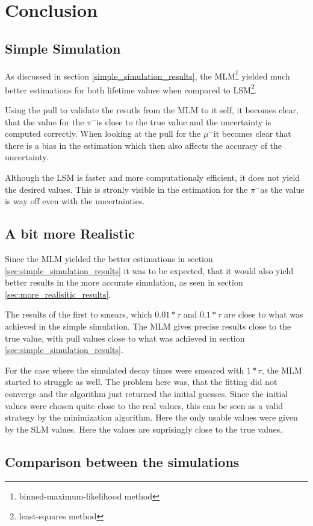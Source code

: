 \documentclass[11pt, a4paper, oneside]{book}
\newcommand{\pion}{$\pi^{-}$}
\newcommand{\muon}{$\mu^{-}$}
\begin{document}
\chapter{Conclusion}
\section{Simple Simulation}
As discussed in section \ref{simple_simulation_results}, the MLM\footnote{binned-maximum-likelihood method} yielded much better estimations for both lifetime values when compared to LSM\footnote{least-squares method}. 

Using the pull to validate the resutls from the MLM to it self, it becomes clear, that the value for the \pion is close to the true value and the uncertainty is computed correctly. When looking at the pull for the \muon it becomes clear that there is a bias in the estimation which then also affects the accuracy of the uncertainty. 

Although the LSM is faster and more computationaly efficient, it does not yield the desired values. This is stronly visible in the estimation for the \pion as the value is way off even with the uncertainties. 

\section{A bit more Realistic}
Since the MLM yielded the better estimations in section \ref{sec:simple_simulation_results} it was to be expected, that it would also yield better results in the more accurate simulation, as seen in section \ref{sec:more_realisitic_results}.

The results of the first to smears, which $0.01 * \tau$ and $0.1 * \tau$ are close to what was achieved in the simple simulation. The MLM gives precise results close to the true value, with pull values close to what was achieved in section \ref{sec:simple_simulation_results}. 

For the case where the simulated decay times were smeared with $1 * \tau$, the MLM started to struggle as well. The problem here was, that the fitting did not converge and the algorithm just returned the initial guesses. Since the initial values were chosen quite close to the real values, this can be seen as a valid strategy by the minimization algorithm. Here the only usable values were given by the SLM values. Here the values are suprisingly close to the true values.  

\section{Comparison between the simulations}


\end{document}
